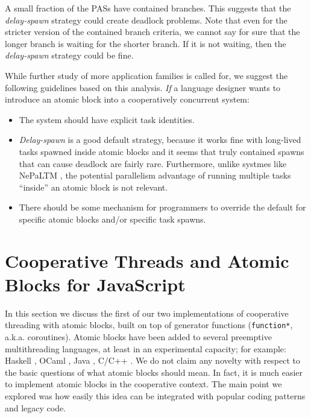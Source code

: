 \documentclass[acmsmall,anonymous,review]{acmart}\settopmatter{printfolios=true,printccs=false,printacmref=false}
\begin{document}
A small fraction of the PASs have contained branches.
This suggests that the \emph{delay-spawn} strategy could create deadlock problems.
Note that even for the stricter version of the contained branch criteria, we cannot say for sure that the longer branch is waiting for the shorter branch.
If it is not waiting, then the \emph{delay-spawn} strategy could be fine.


While further study of more application families is called for, we suggest the following guidelines based on this analysis.
\emph{If} a language designer wants to introduce an atomic block into a cooperatively concurrent system:
\begin{itemize}
\item The system should have explicit task identities.
\item \emph{Delay-spawn} is a good default strategy, because it works fine with long-lived tasks spawned inside atomic blocks and it seems that truly contained spawns that can cause deadlock are fairly rare.
  Furthermore, unlike systmes like NePaLTM \cite{Volos2009}, the potential parallelism advantage of running multiple tasks ``inside'' an atomic block is not relevant.
\item There should be some mechanism for programmers to override the default for specific atomic blocks and/or specific task spawns.
\end{itemize}

\section{Cooperative Threads and Atomic Blocks for JavaScript}

In this section we discuss the first of our two implementations of cooperative threading with atomic blocks, built on top of generator functions (\texttt{function*}, a.k.a. coroutines).
Atomic blocks have been added to several preemptive multithreading languages, at least in an experimental capacity; for example: Haskell \cite{Harris2005}, OCaml \cite{Ringenburg2005}, Java \cite{Herlihy2006}, C/C++ \cite{Ni2008}.
We do not claim any novelty with respect to the basic questions of what atomic blocks should mean.
In fact, it is much easier to implement atomic blocks in the cooperative context.
The main point we explored was how easily this idea can be integrated with popular coding patterns and legacy code.
\end{document}
